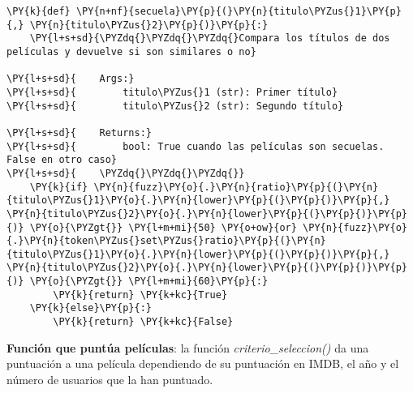     \begin{tcolorbox}[breakable, size=fbox, boxrule=1pt, pad at break*=1mm,colback=cellbackground, colframe=cellborder]
\begin{Verbatim}[commandchars=\\\{\}]
\PY{k}{def} \PY{n+nf}{secuela}\PY{p}{(}\PY{n}{titulo\PYZus{}1}\PY{p}{,} \PY{n}{titulo\PYZus{}2}\PY{p}{)}\PY{p}{:}   
    \PY{l+s+sd}{\PYZdq{}\PYZdq{}\PYZdq{}Compara los títulos de dos películas y devuelve si son similares o no}

\PY{l+s+sd}{    Args:}
\PY{l+s+sd}{        titulo\PYZus{}1 (str): Primer título}
\PY{l+s+sd}{        titulo\PYZus{}2 (str): Segundo título}

\PY{l+s+sd}{    Returns:}
\PY{l+s+sd}{        bool: True cuando las películas son secuelas. False en otro caso}
\PY{l+s+sd}{    \PYZdq{}\PYZdq{}\PYZdq{}}
    \PY{k}{if} \PY{n}{fuzz}\PY{o}{.}\PY{n}{ratio}\PY{p}{(}\PY{n}{titulo\PYZus{}1}\PY{o}{.}\PY{n}{lower}\PY{p}{(}\PY{p}{)}\PY{p}{,} \PY{n}{titulo\PYZus{}2}\PY{o}{.}\PY{n}{lower}\PY{p}{(}\PY{p}{)}\PY{p}{)} \PY{o}{\PYZgt{}} \PY{l+m+mi}{50} \PY{o+ow}{or} \PY{n}{fuzz}\PY{o}{.}\PY{n}{token\PYZus{}set\PYZus{}ratio}\PY{p}{(}\PY{n}{titulo\PYZus{}1}\PY{o}{.}\PY{n}{lower}\PY{p}{(}\PY{p}{)}\PY{p}{,} \PY{n}{titulo\PYZus{}2}\PY{o}{.}\PY{n}{lower}\PY{p}{(}\PY{p}{)}\PY{p}{)} \PY{o}{\PYZgt{}} \PY{l+m+mi}{60}\PY{p}{:}
        \PY{k}{return} \PY{k+kc}{True}
    \PY{k}{else}\PY{p}{:}
        \PY{k}{return} \PY{k+kc}{False}
\end{Verbatim}
\end{tcolorbox}

    \textbf{Función que puntúa películas}: la función
\emph{criterio\_seleccion()} da una puntuación a una película
dependiendo de su puntuación en IMDB, el año y el número de usuarios que
la han puntuado.

